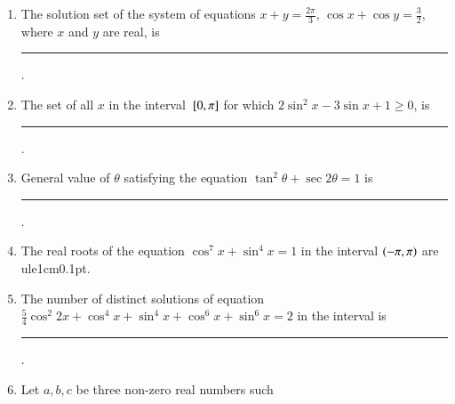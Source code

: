 \begin{enumerate}[label=\thesubsection.\arabic*,ref=\thesubsection.\theenumi]
%
    \item The solution set of the system of equations $x + y = \frac{2\pi}{3}$, $\cos x + \cos y = \frac{3}{2}$, where $x$ and $y$ are real, is \rule{1cm}{0.1pt}. 
        \hfill{}
    \item The set of all $x$ in the interval ${}\left[0,\pi\right]$ for which $2 \sin^2 x -3\sin x +1 \ge 0$,  is \rule{1cm}{0.1pt}. 

        \hfill{}





    \item General value of $\theta$ satisfying the equation $\tan^{2}\theta +\sec2\theta = 1$  is \rule{1cm}{0.1pt}. 
        \hfill{}



    \item The real roots of the equation $\cos^{7}x + \sin^{4}x = 1$ in the interval $\left(-\pi,\pi\right)$  are 
ule{1cm}{0.1pt}. 
        \hfill{}

\item The number of distinct solutions of equation
$\frac{5}{4}\cos^2 2x+\cos^4 x+\sin^4 x+\cos^6 x+\sin^6 x=2$
in the interval   is \rule{1cm}{0.1pt}.\hfill{} 
\item Let $a, b, c$ be three non-zero real numbers such


\end{enumerate}
